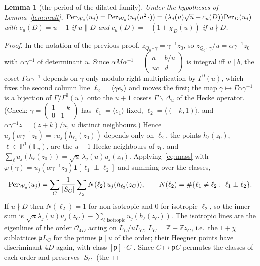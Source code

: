 \documentclass[11pt,a4paper]{article}
\newtheorem{lemma}[theorem]{Lemma}
\theoremstyle{remark}\newtheorem{remark}[theorem]{Remark}
\newcommand{\Z}{\mathbb Z}\newcommand{\R}{\mathbb R}\newcommand{\Q}{\mathbb Q}\newcommand{\HH}{\mathbb H}
\begin{document}
\begin{lemma}[the period of the dilated family]\label{lem:period}
Under the hypotheses of Lemma~\ref{lem:mult},
$\mathrm{Per}_{\mathcal W_u}(u_j)=\mathrm{Per}_{\mathcal W_u}(u_j(u^2\,\cdot))=\bigl(\lambda_j(u)\sqrt u+c_u(D)\bigr)\mathrm{Per}_D(u_j)$ with
$c_u(D)=u-1$ if $u\parallel D$ and $c_u(D)=-(1+\chi_D(u))$ if $u\nmid D$.
\end{lemma}
\begin{proof}
In the notation of the previous proof, $z_{Q_0\circ\gamma}=\gamma^{-1}z_0$, so $z_{Q_0\circ\gamma}/u=\alpha\gamma^{-1}z_0$ with
$\alpha\gamma^{-1}$ of determinant $u$. Since $\alpha M\alpha^{-1}=\left(\begin{smallmatrix}a&b/u\\ uc&d\end{smallmatrix}\right)$ is integral iff $u\mid b$, the coset
$\Gamma\alpha\gamma^{-1}$ depends on $\gamma$ only modulo right multiplication by $\Gamma^0(u)$, which fixes the second column
line $\ell_2=\langle\gamma e_2\rangle$ and moves the first; the map $\gamma\mapsto\Gamma\alpha\gamma^{-1}$ is a bijection of
$\Gamma/\Gamma^0(u)$ onto the $u+1$ cosets $\Gamma\backslash\Delta_u$ of the Hecke operator. (Check: $\gamma=\left(\begin{smallmatrix}1&-k\\0&1\end{smallmatrix}\right)$
has $\ell_1=\langle e_1\rangle$ fixed, $\ell_2=\langle(-k,1)\rangle$, and $\alpha\gamma^{-1}z=(z+k)/u$, $u$ distinct neighbours.)
Hence $u_j(\alpha\gamma^{-1}z_0)=:u_j(h_{\ell_2}(z_0))$ depends only on $\ell_2$, the points $h_\ell(z_0)$, $\ell\in\mathbb P^1(\mathbb F_u)$,
are the $u+1$ Hecke neighbours of $z_0$, and $\sum_\ell u_j(h_\ell(z_0))=\sqrt u\,\lambda_j(u)u_j(z_0)$. Applying~\eqref{eq:mass} with
$\varphi(\gamma)=u_j(\alpha\gamma^{-1}z_0)\mathbf 1[\ell_1\perp\ell_2]$ and summing over the classes,
\[
\mathrm{Per}_{\mathcal W_u}(u_j)=\sum_C\frac1{|S_C|}\sum_{\ell_2}N(\ell_2)\,u_j(h_{\ell_2}(z_C)),\qquad N(\ell_2)=\#\{\ell_1\ne\ell_2:\ \ell_1\perp\ell_2\}.
\]
If $u\nmid D$ then $N(\ell_2)=1$ for non-isotropic and $0$ for isotropic $\ell_2$, so the inner sum is
$\sqrt u\lambda_j(u)u_j(z_C)-\sum_{\ell\text{ isotropic}}u_j(h_\ell(z_C))$. The isotropic lines are the eigenlines of the order
$\mathcal O_{4D}$ acting on $L_C/uL_C$, $L_C=\Z+\Z z_C$, i.e.\ the $1+\chi$ sublattices $\mathfrak pL_C$ for the primes
$\mathfrak p\mid u$ of the order; their Heegner points have discriminant $4D$ again, with class $[\mathfrak p]\cdot C$
\cite[II]{GrossKohnenZagier1987}. Since $C\mapsto\mathfrak pC$ permutes the classes of each order and preserves $|S_C|$ (the

\end{proof}
\end{document}
